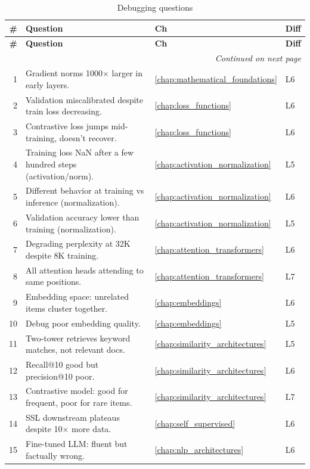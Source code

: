 \begin{longtable}{rp{8.5cm}ll}
\caption{Debugging questions} \\
\toprule
\textbf{\#} & \textbf{Question} & \textbf{Ch} & \textbf{Diff} \\
\midrule
\endfirsthead
\toprule
\textbf{\#} & \textbf{Question} & \textbf{Ch} & \textbf{Diff} \\
\midrule
\endhead
\midrule
\multicolumn{4}{r}{\textit{Continued on next page}} \\
\endfoot
\bottomrule
\endlastfoot

1 & Gradient norms 1000$\times$ larger in early layers. & \ref{chap:mathematical_foundations} & L6 \\
2 & Validation miscalibrated despite train loss decreasing. & \ref{chap:loss_functions} & L6 \\
3 & Contrastive loss jumps mid-training, doesn't recover. & \ref{chap:loss_functions} & L6 \\
4 & Training loss NaN after a few hundred steps (activation/norm). & \ref{chap:activation_normalization} & L5 \\
5 & Different behavior at training vs inference (normalization). & \ref{chap:activation_normalization} & L6 \\
6 & Validation accuracy lower than training (normalization). & \ref{chap:activation_normalization} & L5 \\
7 & Degrading perplexity at 32K despite 8K training. & \ref{chap:attention_transformers} & L6 \\
8 & All attention heads attending to same positions. & \ref{chap:attention_transformers} & L7 \\
9 & Embedding space: unrelated items cluster together. & \ref{chap:embeddings} & L6 \\
10 & Debug poor embedding quality. & \ref{chap:embeddings} & L5 \\
11 & Two-tower retrieves keyword matches, not relevant docs. & \ref{chap:similarity_architectures} & L5 \\
12 & Recall@10 good but precision@10 poor. & \ref{chap:similarity_architectures} & L6 \\
13 & Contrastive model: good for frequent, poor for rare items. & \ref{chap:similarity_architectures} & L7 \\
14 & SSL downstream plateaus despite 10$\times$ more data. & \ref{chap:self_supervised} & L6 \\
15 & Fine-tuned LLM: fluent but factually wrong. & \ref{chap:nlp_architectures} & L6 \\

\end{longtable}
